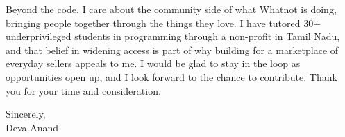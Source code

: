 \documentclass[letterpaper,11pt]{article}
\begin{document}
Beyond the code, I care about the community side of what Whatnot is doing, bringing people together through the things they love. I have tutored 30+ underprivileged students in programming through a non-profit in Tamil Nadu, and that belief in widening access is part of why building for a marketplace of everyday sellers appeals to me. I would be glad to stay in the loop as opportunities open up, and I look forward to the chance to contribute. Thank you for your time and consideration.

\vspace{4pt}

\noindent Sincerely, \\
Deva Anand
\end{document}

